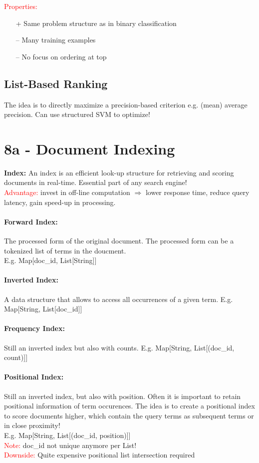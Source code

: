 \documentclass[a4paper,11pt]{article}
\newcommand{\msection}[1]{\section{#1}\vspace{-0.5mm}}
\begin{document}
\begin{multicols}{2}
\textcolor{red}{Properties:}
\begin{itemize}
  \item[+] Same problem structure as in binary classification
  \item[--] Many training examples
  \item[--] No focus on ordering at top
\end{itemize}

\subsection{List-Based Ranking}
The idea is to directly maximize a precision-based criterion e.g. (mean) average precision. Can use structured SVM to optimize!


\msection{8a - Document Indexing}
\textbf{Index: } An index is an efficient look-up structure for retrieving and scoring documents in real-time. Essential part of any search engine!\\
\textcolor{red}{Advantage:} invest in off-line computation $\Rightarrow$ lower response time, reduce query latency, gain speed-up in processing.

\paragraph{Forward Index:} The processed form of the original document. The processed form can be a tokenized list of terms in the doucment.\\
E.g. Map[doc\_id, List[String]]

\paragraph{Inverted Index:} A data structure that allows to access all occurrences of a given term. E.g. Map[String, List[doc\_id]]

\paragraph{Frequency Index:} Still an inverted index but also with counts. E.g. Map[String, List[(doc\_id, count)]]

\paragraph{Positional Index:} Still an inverted index, but also with position. Often it is important to retain positional information of term occurences. The idea is to create a positional index to score documents higher, which contain the query terms as subsequent terms or in close proximity! \\
E.g. Map[String, List[(doc\_id, position)]]\\
\textcolor{red}{Note:} doc\_id not unique anymore per List!\\
\textcolor{red}{Downside:} Quite expensive positional list intersection required


\end{multicols}
\end{document}
